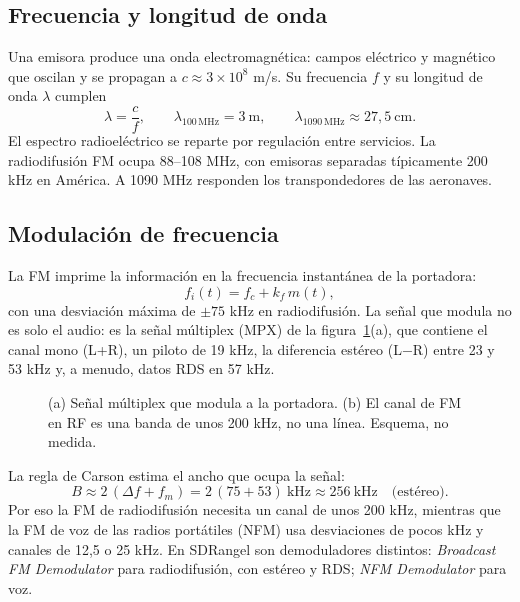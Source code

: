 \subsection{Frecuencia y longitud de onda}

Una emisora produce una onda electromagnética: campos eléctrico y magnético que oscilan y se propagan a $c \approx 3\times10^{8}$ m/s. Su frecuencia $f$ y su longitud de onda $\lambda$ cumplen
\begin{equation}
\lambda = \frac{c}{f}, \qquad \lambda_{100\,\mathrm{MHz}} = 3~\mathrm{m}, \qquad \lambda_{1090\,\mathrm{MHz}} \approx 27{,}5~\mathrm{cm}.
\end{equation}
El espectro radioeléctrico se reparte por regulación entre servicios. La radiodifusión FM ocupa 88--108 MHz, con emisoras separadas típicamente 200 kHz en América. A 1090 MHz responden los transpondedores de las aeronaves.

\subsection{Modulación de frecuencia}

La FM imprime la información en la frecuencia instantánea de la portadora:
\begin{equation}
f_i(t) = f_c + k_f\, m(t),
\end{equation}
con una desviación máxima de $\pm 75$ kHz en radiodifusión. La señal que modula no es solo el audio: es la señal múltiplex (MPX) de la figura~\ref{fig:a-fm}(a), que contiene el canal mono (L+R), un piloto de 19 kHz, la diferencia estéreo (L$-$R) entre 23 y 53 kHz y, a menudo, datos RDS en 57 kHz.

\begin{figure}[H]
\centering
\resizebox{\linewidth}{!}{}
\caption{(a) Señal múltiplex que modula a la portadora. (b) El canal de FM en RF es una banda de unos 200 kHz, no una línea. Esquema, no medida.}
\label{fig:a-fm}
\end{figure}

La regla de Carson estima el ancho que ocupa la señal:
\begin{equation}
B \approx 2\,(\Delta f + f_m) = 2\,(75 + 53)~\text{kHz} \approx 256~\text{kHz}\quad\text{(estéreo)}.
\end{equation}
Por eso la FM de radiodifusión necesita un canal de unos 200 kHz, mientras que la FM de voz de las radios portátiles (NFM) usa desviaciones de pocos kHz y canales de 12,5 o 25 kHz. En SDRangel son demoduladores distintos: \emph{Broadcast FM Demodulator} para radiodifusión, con estéreo y RDS; \emph{NFM Demodulator} para voz.

